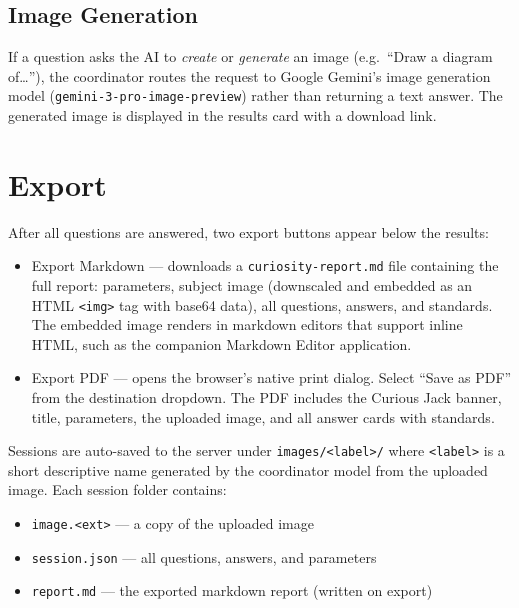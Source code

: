 \documentclass[11pt]{article}
\begin{document}
\subsection{Image Generation}

If a question asks the AI to \emph{create} or \emph{generate} an image
(e.g.\ ``Draw a diagram of\ldots''), the coordinator routes the request
to Google Gemini's image generation model (\texttt{gemini-3-pro-image-preview})
rather than returning a text answer. The generated image is displayed in
the results card with a download link.

\section{Export}

After all questions are answered, two export buttons appear below the
results:

\begin{itemize}[nosep]
  \item \textsf{Export Markdown} --- downloads a \texttt{curiosity-report.md}
        file containing the full report: parameters, subject image
        (downscaled and embedded as an HTML \texttt{<img>} tag with base64
        data), all questions, answers, and standards. The embedded image
        renders in markdown editors that support inline HTML, such as the
        companion Markdown Editor application.
  \item \textsf{Export PDF} --- opens the browser's native print dialog.
        Select ``Save as PDF'' from the destination dropdown. The PDF
        includes the Curious Jack banner, title, parameters, the uploaded
        image, and all answer cards with standards.
\end{itemize}

Sessions are auto-saved to the server under
\texttt{images/<label>/} where \texttt{<label>} is a short descriptive
name generated by the coordinator model from the uploaded image. Each
session folder contains:

\begin{itemize}[nosep]
  \item \texttt{image.<ext>} --- a copy of the uploaded image
  \item \texttt{session.json} --- all questions, answers, and parameters
  \item \texttt{report.md} --- the exported markdown report (written on export)
\end{itemize}
\end{document}
